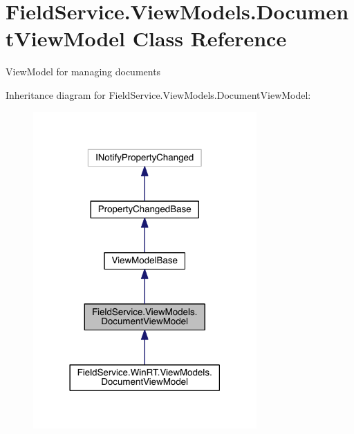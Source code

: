 \hypertarget{class_field_service_1_1_view_models_1_1_document_view_model}{\section{Field\+Service.\+View\+Models.\+Document\+View\+Model Class Reference}
\label{class_field_service_1_1_view_models_1_1_document_view_model}
}


View\+Model for managing documents  




Inheritance diagram for Field\+Service.\+View\+Models.\+Document\+View\+Model\+:
\nopagebreak
\begin{figure}[H]
\begin{center}
\leavevmode
\includegraphics[width=242pt]{class_field_service_1_1_view_models_1_1_document_view_model__inherit__graph}
\end{center}
\end{figure}


